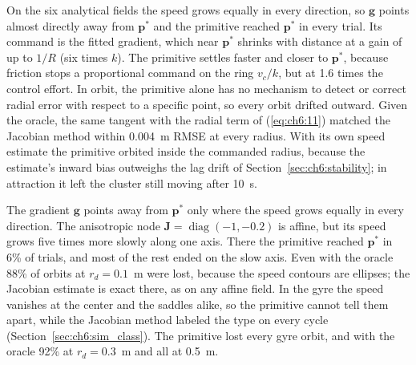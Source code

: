 On the six analytical fields the speed grows equally in every direction, so $\mathbf{g}$ points almost directly away from $\mathbf{p}^*$ and the primitive reached $\mathbf{p}^*$ in every trial. Its command is the fitted gradient, which near $\mathbf{p}^*$ shrinks with distance at a gain of up to $1/R$ (six times $k$). The primitive settles faster and closer to $\mathbf{p}^*$, because friction stops a proportional command on the ring $v_c/k$, but at 1.6 times the control effort. In orbit, the primitive alone has no mechanism to detect or correct radial error with respect to a specific point, so every orbit drifted outward. Given the oracle, the same tangent with the radial term of (\ref{eq:ch6:11}) matched the Jacobian method within 0.004~m RMSE at every radius. With its own speed estimate the primitive orbited inside the commanded radius, because the estimate's inward bias outweighs the lag drift of Section~\ref{sec:ch6:stability}; in attraction it left the cluster still moving after 10~s.

The gradient $\mathbf{g}$ points away from $\mathbf{p}^*$ only where the speed grows equally in every direction. The anisotropic node $\mathbf{J} = \operatorname{diag}(-1, -0.2)$ is affine, but its speed grows five times more slowly along one axis. There the primitive reached $\mathbf{p}^*$ in 6\% of trials, and most of the rest ended on the slow axis. Even with the oracle 88\% of orbits at $r_d = 0.1$~m were lost, because the speed contours are ellipses; the Jacobian estimate is exact there, as on any affine field. In the gyre the speed vanishes at the center and the saddles alike, so the primitive cannot tell them apart, while the Jacobian method labeled the type on every cycle (Section~\ref{sec:ch6:sim_class}). The primitive lost every gyre orbit, and with the oracle 92\% at $r_d = 0.3$~m and all at 0.5~m.

